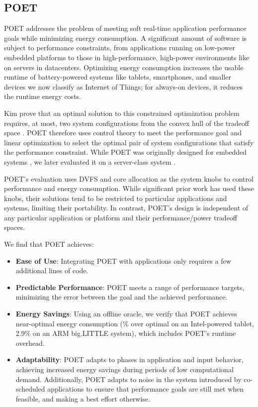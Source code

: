 \subsection{POET}

POET addresses the problem of meeting soft real-time application performance goals while minimizing energy consumption.
A significant amount of software is subject to performance constraints, from applications running on low-power embedded platforms to those in high-performance, high-power environments like on servers in datacenters.
Optimizing energy consumption increases the usable runtime of battery-powered systems like tablets, smartphones, and smaller devices we now classify as Internet of Things; for always-on devices, it reduces the runtime energy costs.

Kim \etal prove that an optimal solution to this constrained optimization problem requires, at most, two system configurations from the convex hull of the tradeoff space \cite{kim-cpsna2015}.
POET therefore uses control theory to meet the performance goal and linear optimization to select the optimal pair of system configurations that satisfy the performance constraint.
While POET was originally designed for embedded systems \cite{POET}, we later evaluated it on a server-class system \cite{POETMCSoC}.

POET's evaluation uses DVFS and core allocation as the system knobs to control performance and energy consumption.
While significant prior work has used these knobs, their solutions tend to be restricted to particular applications and systems, limiting their portability.
In contrast, POET's design is independent of any particular application or platform and their performance/power tradeoff spaces.

We find that POET achieves:
\begin{itemize}
\item \textbf{Ease of Use}: Integrating POET with applications only requires a few additional lines of code.
\item \textbf{Predictable Performance}: POET meets a range of performance targets, minimizing the error between the goal and the achieved performance.
\item \textbf{Energy Savings}: Using an offline oracle, we verify that POET achieves near-optimal energy consumption (\% over optimal on an Intel-powered tablet, 2.9\% on an ARM big.LITTLE system), which includes POET's runtime overhead.
\item \textbf{Adaptability}: POET adapts to phases in application and input behavior, achieving increased energy savings during periods of low computational demand.
Additionally, POET adapts to noise in the system introduced by co-scheduled applications to ensure that performance goals are still met when feasible, and making a best effort otherwise.
\end{itemize}


